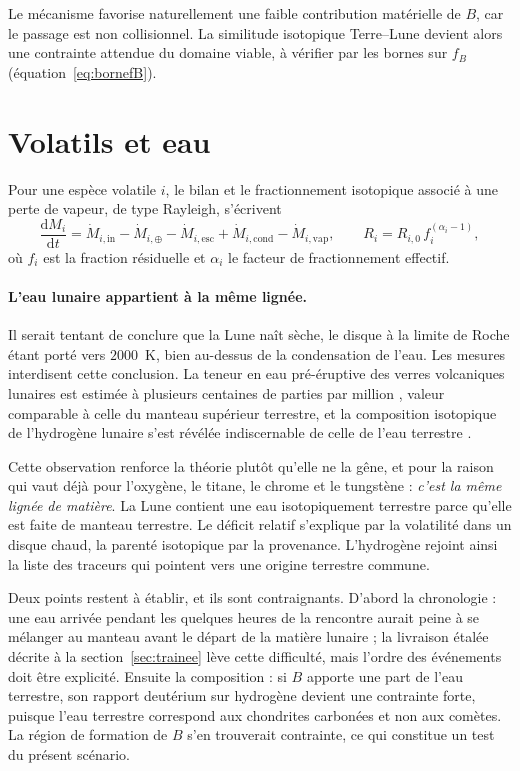 \documentclass[11pt,a4paper,openany]{report}
\newcommand{\dd}{\mathrm{d}}
\begin{document}
\begin{apport}
Le mécanisme favorise naturellement une faible contribution matérielle de $B$, car le passage est
non collisionnel. La similitude isotopique Terre--Lune devient alors une contrainte attendue du
domaine viable, à vérifier par les bornes sur $f_B$ (équation~\eqref{eq:bornefB}).
\end{apport}

\section{Volatils et eau}

Pour une espèce volatile $i$, le bilan et le fractionnement isotopique associé à une perte de
vapeur, de type Rayleigh, s'écrivent
\begin{equation}
\frac{\dd M_i}{\dd t}=\dot M_{i,\mathrm{in}}-\dot M_{i,\oplus}-\dot M_{i,\mathrm{esc}}
+\dot M_{i,\mathrm{cond}}-\dot M_{i,\mathrm{vap}},
\qquad
R_i=R_{i,0}\,f_i^{(\alpha_i-1)},
\label{eq:volatils}
\end{equation}
où $f_i$ est la fraction résiduelle et $\alpha_i$ le facteur de fractionnement effectif.

\paragraph{L'eau lunaire appartient à la même lignée.}
Il serait tentant de conclure que la Lune naît sèche, le disque à la limite de Roche étant porté
vers $2000$~K, bien au-dessus de la condensation de l'eau. Les mesures interdisent cette
conclusion. La teneur en eau pré-éruptive des verres volcaniques lunaires est estimée à plusieurs
centaines de parties par million \cite{Saal2008}, valeur comparable à celle du manteau supérieur
terrestre, et la composition isotopique de l'hydrogène lunaire s'est révélée indiscernable de celle
de l'eau terrestre \cite{Saal2013}.

Cette observation renforce la théorie plutôt qu'elle ne la gêne, et pour la raison qui vaut déjà
pour l'oxygène, le titane, le chrome et le tungstène : \emph{c'est la même lignée de matière}. La
Lune contient une eau isotopiquement terrestre parce qu'elle est faite de manteau terrestre. Le
déficit relatif s'explique par la volatilité dans un disque chaud, la parenté isotopique par la
provenance. L'hydrogène rejoint ainsi la liste des traceurs qui pointent vers une origine
terrestre commune.

\begin{controle}
Deux points restent à établir, et ils sont contraignants. D'abord la chronologie : une eau arrivée
pendant les quelques heures de la rencontre aurait peine à se mélanger au manteau avant le départ
de la matière lunaire ; la livraison étalée décrite à la section~\ref{sec:trainee} lève cette
difficulté, mais l'ordre des événements doit être explicité. Ensuite la composition : si $B$
apporte une part de l'eau terrestre, son rapport deutérium sur hydrogène devient une contrainte
forte, puisque l'eau terrestre correspond aux chondrites carbonées et non aux comètes. La région de
formation de $B$ s'en trouverait contrainte, ce qui constitue un test du présent scénario.
\end{controle}
\end{document}
